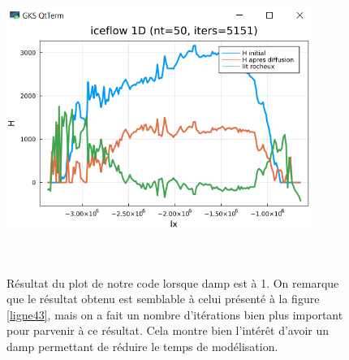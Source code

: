 \documentclass{article}
\begin{document}
\begin{figure}[!htpb]
\centering
\includegraphics[width=10cm, keepaspectratio=true, height=10cm]{Damp1.png}
\caption{Résultat du plot de notre code lorsque damp est à 1. On remarque que le résultat obtenu est semblable à celui présenté à la figure \ref{ligne43}, mais on a fait un nombre d'itérations bien plus important pour parvenir à ce résultat. Cela montre bien l'intérêt d'avoir un damp permettant de réduire le temps de modélisation.}
\end{figure}
\newpage


\end{document}
